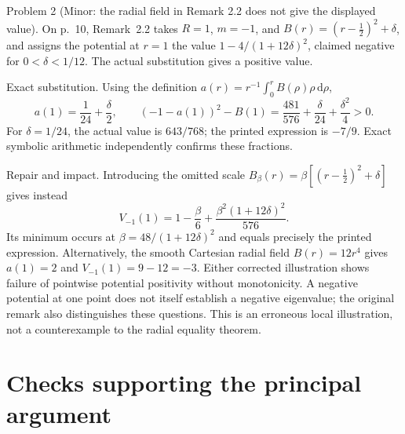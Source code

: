 \documentclass[10pt]{article}
\begin{document}
Problem 2 (Minor: the radial field in Remark 2.2 does not give the displayed value).  On p. 10, Remark 2.2 takes \(R=1\), \(m=-1\), and \(B(r)=(r-\tfrac12)^2+\delta\), and assigns the potential at \(r=1\) the value \(1-4/(1+12\delta)^2\), claimed negative for \(0<\delta<1/12\). The actual substitution gives a positive value.\par
Exact substitution. Using the definition \(a(r)=r^{-1}\int_0^r B(\rho)\rho\,\mathrm d\rho\), \[a(1)=\frac1{24}+\frac{\delta}{2},\qquad
 \left(-1-a(1)\right)^2-B(1)
       =\frac{481}{576}+\frac{\delta}{24}+\frac{\delta^2}{4}>0 .\] For \(\delta=1/24\), the actual value is \(643/768\); the printed expression is \(-7/9\). Exact symbolic arithmetic independently confirms these fractions.\par
Repair and impact. Introducing the omitted scale \(B_\beta(r)=\beta[(r-\tfrac12)^2+\delta]\) gives instead \[V_{-1}(1)=1-\frac{\beta}{6}
             +\frac{\beta^2(1+12\delta)^2}{576}.\] Its minimum occurs at \(\beta=48/(1+12\delta)^2\) and equals precisely the printed expression. Alternatively, the smooth Cartesian radial field \(B(r)=12r^4\) gives \(a(1)=2\) and \(V_{-1}(1)=9-12=-3\). Either corrected illustration shows failure of pointwise potential positivity without monotonicity. A negative potential at one point does not itself establish a negative eigenvalue; the original remark also distinguishes these questions. This is an erroneous local illustration, not a counterexample to the radial equality theorem.\par
\section*{Checks supporting the principal argument}
\end{document}
